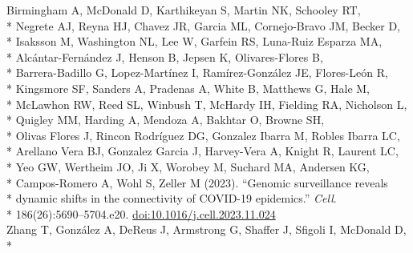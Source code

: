 \documentclass[margin,line]{res}
\begin{document}
\begin{resume}
\hspace*{9.5mm} Birmingham A, McDonald D, Karthikeyan S, Martin NK, Schooley RT,\\*
\hspace*{9.5mm} Negrete AJ, Reyna HJ, Chavez JR, Garcia ML, Cornejo-Bravo JM, Becker D,\\*
\hspace*{9.5mm} Isaksson M, Washington NL, Lee W, Garfein RS, Luna-Ruiz Esparza MA,\\*
\hspace*{9.5mm} Alc\'{a}ntar-Fern\'{a}ndez J, Henson B, Jepsen K, Olivares-Flores B,\\*
\hspace*{9.5mm} Barrera-Badillo G, Lopez-Mart\'{i}nez I, Ram\'{i}rez-Gonz\'{a}lez JE, Flores-Le\'{o}n R,\\*
\hspace*{9.5mm} Kingsmore SF, Sanders A, Pradenas A, White B, Matthews G, Hale M,\\*
\hspace*{9.5mm} McLawhon RW, Reed SL, Winbush T, McHardy IH, Fielding RA, Nicholson L,\\*
\hspace*{9.5mm} Quigley MM, Harding A, Mendoza A, Bakhtar O, Browne SH,\\*
\hspace*{9.5mm} Olivas Flores J, Rincon Rodríguez DG, Gonzalez Ibarra M, Robles Ibarra LC,\\*
\hspace*{9.5mm} Arellano Vera BJ, Gonzalez Garcia J, Harvey-Vera A, Knight R, Laurent LC,\\*
\hspace*{9.5mm} Yeo GW, Wertheim JO, Ji X, Worobey M, Suchard MA, Andersen KG,\\*
\hspace*{9.5mm} Campos-Romero A, Wohl S, Zeller M (2023). ``Genomic surveillance reveals\\*
\hspace*{9.5mm} dynamic shifts in the connectivity of COVID-19 epidemics.'' \textit{Cell}.\\*\vspace{2mm}
\hspace*{8mm} 186(26):5690--5704.e20. \href{https://doi.org/10.1016/j.cell.2023.11.024}{doi:10.1016/j.cell.2023.11.024}\\
\hspace*{4mm} Zhang T, Gonz\'alez A, DeReus J, Armstrong G, Shaffer J, Sfigoli I, McDonald D,\\*

\end{resume}
\end{document}
